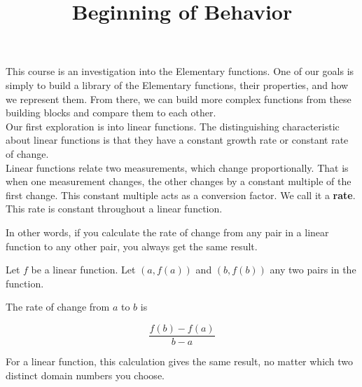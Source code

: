 \documentclass{ximera}
\title{Beginning of Behavior}
\begin{document}
\begin{abstract}
\end{abstract}
\maketitle





This course is an investigation into the Elementary functions.  One of our goals is simply to build a library of the Elementary functions, their properties, and how we represent them.  From there, we can build more complex functions from these building blocks and compare them to each other. \\



Our first exploration is into linear functions. The distinguishing characteristic about linear functions is that they have a constant growth rate or constant rate of change.  \\




Linear functions relate two measurements, which change proportionally.  That is when one measurement changes, the other changes by a constant multiple of the first change.  This constant multiple acts as a conversion factor.  We call it a \textbf{\textcolor{purple!85!blue}{rate}}. \\



This rate is constant throughout a linear function.





In other words, if you calculate the rate of change from any pair in a linear function to any other pair, you always get the same result.

Let $f$ be a linear function.  Let $(a, f(a))$ and $(b, f(b))$ any two pairs in the function.

The rate of change from $a$ to $b$ is 

\[
\frac{f(b) - f(a)}{b-a}
\]


For a linear function, this calculation gives the same result, no matter which two distinct domain numbers you choose.
\end{document}
